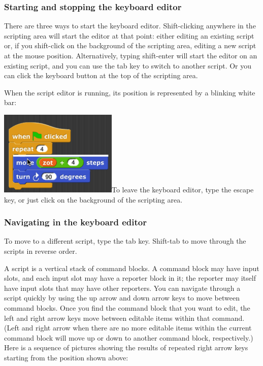 \subsubsection{Starting and stopping the keyboard
editor}\label{starting-and-stopping-the-keyboard-editor}

There are three ways to start the keyboard editor. Shift-clicking
anywhere in the scripting area will start the editor at that point:
either editing an existing script or, if you shift-click on the
background of the scripting area, editing a new script at the mouse
position. Alternatively, typing shift-enter will start the editor on an
existing script, and you can use the tab key to switch to another
script. Or you can click the keyboard button at the top of the scripting
area.

When the script editor is running, its position is represented by a
blinking white bar:

\includegraphics[width=2.20833in,height=1.59375in]{media/image1101.png}To
leave the keyboard editor, type the escape key, or just click on the
background of the scripting area.

\subsubsection{Navigating in the keyboard
editor}\label{navigating-in-the-keyboard-editor}

To move to a different script, type the tab key. Shift-tab to move
through the scripts in reverse order.

A script is a vertical stack of command blocks. A command block may have
input slots, and each input slot may have a reporter block in it; the
reporter may itself have input slots that may have other reporters. You
can navigate through a script quickly by using the up arrow and down
arrow keys to move between command blocks. Once you find the command
block that you want to edit, the left and right arrow keys move between
editable items within that command. (Left and right arrow when there are
no more editable items within the current command block will move up or
down to another command block, respectively.) Here is a sequence of
pictures showing the results of repeated right arrow keys starting from
the position shown above:


